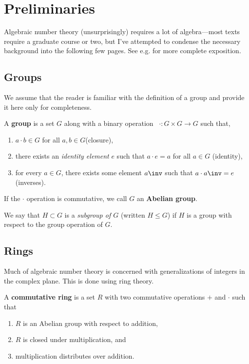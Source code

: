\section{Preliminaries}
\label{sec:preliminaries}

Algebraic number theory (unsurprisingly) requires a lot of algebra---most texts require a graduate course or two, but I've attempted to condense the necessary background into the following few pages. See e.g. \textcite{dummit-foote} for more complete exposition.

\subsection{Groups}

We assume that the reader is familiar with the definition of a group and provide it here only for completeness.

\begin{definition}[Group]
    \label{def:group}
    A \textbf{group} is a set $G$ along with a binary operation \ $\cdot : G \times G \to G$ such that,
    \begin{enumerate}
        \item $a \cdot b \in G$ for all $a, b \in G$(closure),
        \item there exists an \emph{identity element} $e$ such that $a \cdot e = a$ for all $a \in G$ (identity),
        \item for every $a \in G$, there exists some element $a \inv$ such that $a \cdot a \inv = e$ (inverses).
    \end{enumerate}
    If the $\cdot$ operation is commutative, we call $G$ an \textbf{Abelian group}.
\end{definition}

\begin{definition}[Subgroup]
    We say that $H \subset G$ is a \emph{subgroup of $G$} (written $H \leq G$) if $H$ is a group with respect to the group operation of $G$.
\end{definition}

\subsection{Rings}

Much of algebraic number theory is concerned with generalizations of integers in the complex plane. This is done using ring theory.

\begin{definition}
    A \textbf{commutative ring} is a set $R$ with two commutative operations $+$ and $\cdot$ such that
    \begin{enumerate}
        \item $R$ is an Abelian group with respect to addition,
        \item $R$ is closed under multiplication, and
        \item multiplication distributes over addition.
    \end{enumerate}
\end{definition}

